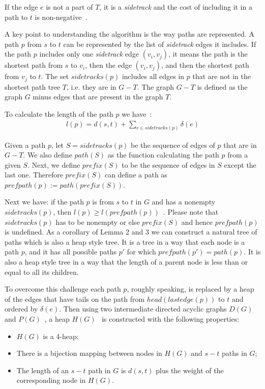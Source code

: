 If the edge $e$ is not a part of $T$, it is a \emph{sidetrack} and the cost of including it in a path to $t$ is non-negative~\cite[Lemma 1]{eppstein1998finding}.

A key point to understanding the algorithm is the way paths are represented. A path $p$ from $s$ to $t$ can be represented by the list of \emph{sidetrack} edges it includes. If the path $p$ includes only one \emph{sidetrack} edge $(v_i, v_j)$, it means the path is the shortest path from $s$ to $v_i$, then the edge $(v_i, v_j)$, and then the shortest path from $v_j$ to $t$. The set $sidetracks(p)$ includes all edges in $p$ that are not in the shortest path tree $T$, i.e. they are in $G - T$. The graph $G - T$ is defined as the graph $G$ minus edges that are present in the graph $T$.

To calculate the length of the path $p$ we have~\cite[Lemma 2]{eppstein1998finding}:
\begin{align}
  l(p) = d(s, t) + \sum_{e \in sidetracks(p)} \delta(e)
\end{align}

Given a path $p$, let $S = sidetracks(p)$ be the sequence of edges of $p$ that are in $G - T$. We also define $path(S)$ as the function calculating the path $p$ from a given $S$. Next, we define $prefix(S)$ to be the sequence of edges in $S$ except the last one. Therefore $prefix(S)$ can define a path as $prefpath(p) := path(prefix(S))$.

Next we have: if the path $p$ is from $s$ to $t$ in $G$ and has a nonempty $sidetracks(p)$, then $l(p) \geq l(prefpath(p))$~\cite[Lemma 3]{eppstein1998finding}. Please note that $sidetracks(p)$ has to be nonempty or else $prefix(S)$ and hence $prefpath(p)$ is undefined. As a corollary of Lemma 2 and 3 we can construct a natural tree of paths which is also a heap style tree. It is a tree in a way that each node is a path $p$, and it has all possible paths $p'$ for which $prefpath(p') = path(p)$. It is also a heap style tree in a way that the length of a parent node is less than or equal to all its children.

To overcome this challenge each path $p$, roughly speaking, is replaced by a heap of the edges that have tails on the path from $head(lastedge(p))$ to $t$ and ordered by $\delta(e)$. Then using two intermediate directed acyclic graphs $D(G)$~\cite[Lemma 4]{eppstein1998finding} and $P(G)$~\cite[Lemma 5]{eppstein1998finding}, a heap $H(G)$~\cite[Lemma 6]{eppstein1998finding} is constructed with the following properties:
\begin{itemize}
\item $H(G)$ is a 4-heap;
\item There is a bijection mapping between nodes in $H(G)$ and $s-t$ paths in $G$;
\item The length of an $s-t$ path in $G$ is $d(s,t)$ plus the weight of the corresponding node in $H(G)$.
\end{itemize}

